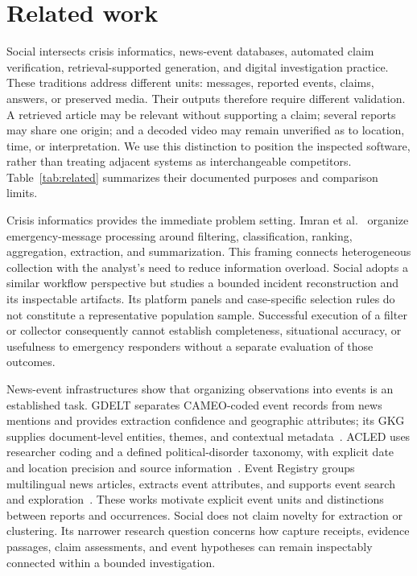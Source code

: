 \section{Related work}
\label{sec:related}

Social intersects crisis informatics, news-event databases, automated claim
verification, retrieval-supported generation, and digital investigation practice.
These traditions address different units: messages, reported events, claims,
answers, or preserved media. Their outputs therefore require different validation.
A retrieved article may be relevant without supporting a claim; several reports
may share one origin; and a decoded video may remain unverified as to location,
time, or interpretation. We use this distinction to position the inspected
software, rather than treating adjacent systems as interchangeable competitors.
Table~\ref{tab:related} summarizes their documented purposes and comparison limits.

Crisis informatics provides the immediate problem setting. Imran et
al.~\cite{imran2015crisis} organize emergency-message processing around filtering,
classification, ranking, aggregation, extraction, and summarization. This framing
connects heterogeneous collection with the analyst's need to reduce information
overload. Social adopts a similar workflow perspective but studies a bounded
incident reconstruction and its inspectable artifacts. Its platform panels and
case-specific selection rules do not constitute a representative population
sample. Successful execution of a filter or collector consequently cannot
establish completeness, situational accuracy, or usefulness to emergency
responders without a separate evaluation of those outcomes.

News-event infrastructures show that organizing observations into events is an
established task. GDELT separates CAMEO-coded event records from news mentions and
provides extraction confidence and geographic attributes; its GKG supplies
document-level entities, themes, and contextual
metadata~\cite{gdelt2015events,gdelt2015gkg}. ACLED uses researcher coding and a
defined political-disorder taxonomy, with explicit date and location precision
and source information~\cite{acledCodebook}. Event Registry groups multilingual
news articles, extracts event attributes, and supports event search and
exploration~\cite{leban2014eventregistry}. These works motivate explicit event
units and distinctions between reports and occurrences. Social does not claim
novelty for extraction or clustering. Its narrower research question concerns
how capture receipts, evidence passages, claim assessments, and event hypotheses
can remain inspectably connected within a bounded investigation.

